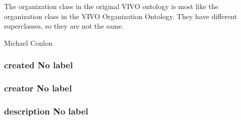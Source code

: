 \documentclass[letterpaper,10pt,english]{sphinxmanual}
\begin{document}
\begin{sphinxShadowBox}

\sphinxAtStartPar
The organization class in the original VIVO ontology is most like the organization class in the VIVO Organization Ontology.  They have different superclasses, so they are not the same.
\end{sphinxShadowBox}

\begin{sphinxShadowBox}

\sphinxAtStartPar
Michael Conlon 
\end{sphinxShadowBox}
\begin{quote}

\ignorespaces \end{quote}


\subsubsection{created \sphinxhyphen{} No label}
\label{\detokenize{doc-created:created-no-label}}\label{\detokenize{doc-created:index-0}}\label{\detokenize{doc-created::doc}}\begin{quote}

\ignorespaces \end{quote}


\subsubsection{creator \sphinxhyphen{} No label}
\label{\detokenize{doc-creator:creator-no-label}}\label{\detokenize{doc-creator:index-0}}\label{\detokenize{doc-creator::doc}}\begin{quote}

\ignorespaces \end{quote}


\subsubsection{description \sphinxhyphen{} No label}
\label{\detokenize{doc-description:description-no-label}}\label{\detokenize{doc-description:index-0}}\label{\detokenize{doc-description::doc}}\begin{quote}

\ignorespaces \end{quote}
\end{document}
